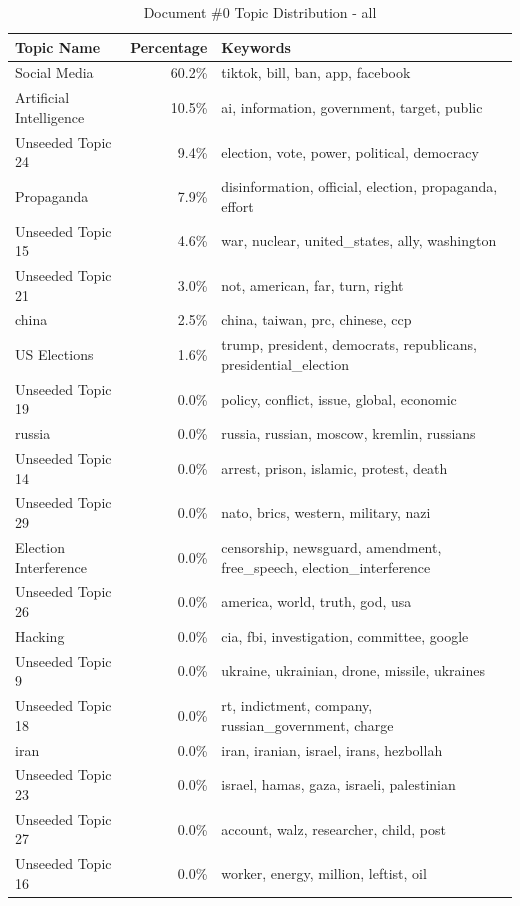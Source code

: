 \begin{table}
\centering
\small
\caption{Document \#0 Topic Distribution - all}
\label{tab:document_topics_0_all}
\begin{tabular}{lrp{8cm}}
\toprule
Topic Name & Percentage & Keywords \\
\midrule
Social Media & 60.2\% & tiktok, bill, ban, app, facebook \\
Artificial Intelligence & 10.5\% & ai, information, government, target, public \\
Unseeded Topic 24 & 9.4\% & election, vote, power, political, democracy \\
Propaganda & 7.9\% & disinformation, official, election, propaganda, effort \\
Unseeded Topic 15 & 4.6\% & war, nuclear, united\_states, ally, washington \\
Unseeded Topic 21 & 3.0\% & not, american, far, turn, right \\
china & 2.5\% & china, taiwan, prc, chinese, ccp \\
US Elections & 1.6\% & trump, president, democrats, republicans, presidential\_election \\
Unseeded Topic 19 & 0.0\% & policy, conflict, issue, global, economic \\
russia & 0.0\% & russia, russian, moscow, kremlin, russians \\
Unseeded Topic 14 & 0.0\% & arrest, prison, islamic, protest, death \\
Unseeded Topic 29 & 0.0\% & nato, brics, western, military, nazi \\
Election Interference & 0.0\% & censorship, newsguard, amendment, free\_speech, election\_interference \\
Unseeded Topic 26 & 0.0\% & america, world, truth, god, usa \\
Hacking & 0.0\% & cia, fbi, investigation, committee, google \\
Unseeded Topic 9 & 0.0\% & ukraine, ukrainian, drone, missile, ukraines \\
Unseeded Topic 18 & 0.0\% & rt, indictment, company, russian\_government, charge \\
iran & 0.0\% & iran, iranian, israel, irans, hezbollah \\
Unseeded Topic 23 & 0.0\% & israel, hamas, gaza, israeli, palestinian \\
Unseeded Topic 27 & 0.0\% & account, walz, researcher, child, post \\
Unseeded Topic 16 & 0.0\% & worker, energy, million, leftist, oil \\

\end{tabular}
\end{table}
